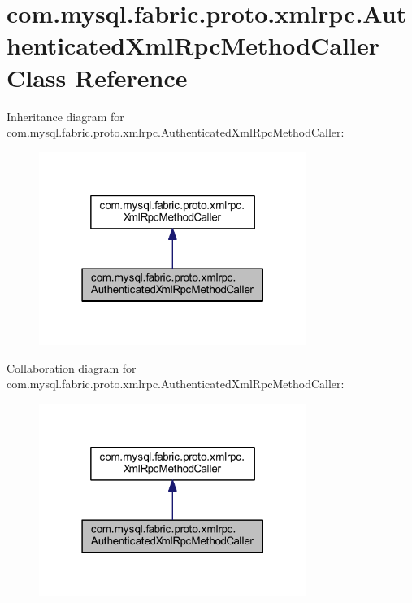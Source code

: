 \hypertarget{classcom_1_1mysql_1_1fabric_1_1proto_1_1xmlrpc_1_1_authenticated_xml_rpc_method_caller}{}\section{com.\+mysql.\+fabric.\+proto.\+xmlrpc.\+Authenticated\+Xml\+Rpc\+Method\+Caller Class Reference}
\label{classcom_1_1mysql_1_1fabric_1_1proto_1_1xmlrpc_1_1_authenticated_xml_rpc_method_caller}


Inheritance diagram for com.\+mysql.\+fabric.\+proto.\+xmlrpc.\+Authenticated\+Xml\+Rpc\+Method\+Caller\+:\nopagebreak
\begin{figure}[H]
\begin{center}
\leavevmode
\includegraphics[width=247pt]{classcom_1_1mysql_1_1fabric_1_1proto_1_1xmlrpc_1_1_authenticated_xml_rpc_method_caller__inherit__graph}
\end{center}
\end{figure}


Collaboration diagram for com.\+mysql.\+fabric.\+proto.\+xmlrpc.\+Authenticated\+Xml\+Rpc\+Method\+Caller\+:\nopagebreak
\begin{figure}[H]
\begin{center}
\leavevmode
\includegraphics[width=247pt]{classcom_1_1mysql_1_1fabric_1_1proto_1_1xmlrpc_1_1_authenticated_xml_rpc_method_caller__coll__graph}
\end{center}
\end{figure}
